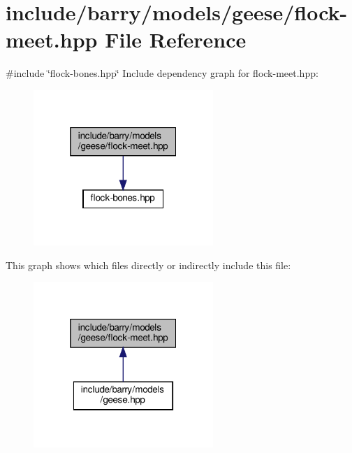 \hypertarget{flock-meet_8hpp}{}\section{include/barry/models/geese/flock-\/meet.hpp File Reference}
\label{flock-meet_8hpp}
{\ttfamily \#include \char`\"{}flock-\/bones.\+hpp\char`\"{}}\newline
Include dependency graph for flock-\/meet.hpp\+:\nopagebreak
\begin{figure}[H]
\begin{center}
\leavevmode
\includegraphics[width=193pt]{flock-meet_8hpp__incl}
\end{center}
\end{figure}
This graph shows which files directly or indirectly include this file\+:\nopagebreak
\begin{figure}[H]
\begin{center}
\leavevmode
\includegraphics[width=193pt]{flock-meet_8hpp__dep__incl}
\end{center}
\end{figure}
